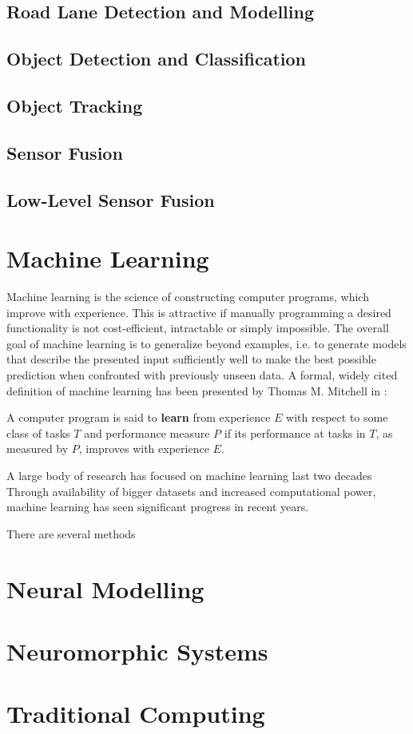 \subsection{Road Lane Detection and Modelling}
\label{subsec:lane}
\subsection{Object Detection and Classification}
\label{subsec:obj_detect}
\subsection{Object Tracking}
\label{subsec:obj_track}
\subsection{Sensor Fusion}
\label{subsec:sensor_fusion}
\subsection{Low-Level Sensor Fusion}
\section{Machine Learning}
Machine learning is the science of constructing computer programs, which improve with experience. 
This is attractive if manually programming a desired functionality is not cost-efficient, intractable or simply impossible.  
The overall goal of machine learning is to generalize beyond examples, i.e. to generate models that describe the presented input sufficiently well to make the best possible prediction when confronted with previously unseen data.
A formal, widely cited definition of machine learning has been presented by Thomas M. Mitchell in \cite{Mitchell1997}:

\begin{defn}
A computer program is said to \textbf{learn} from experience $E$ with respect to some class of tasks $T$ and performance measure $P$ if its performance at tasks in $T$, as measured by $P$, improves with experience $E$.
\end{defn}

A large body of research has focused on machine learning last two decades
Through availability of bigger datasets and increased computational power, machine learning has seen significant progress in recent years.


There are several methods 
\section{Neural Modelling}
\section{Neuromorphic Systems}
\section{Traditional Computing}